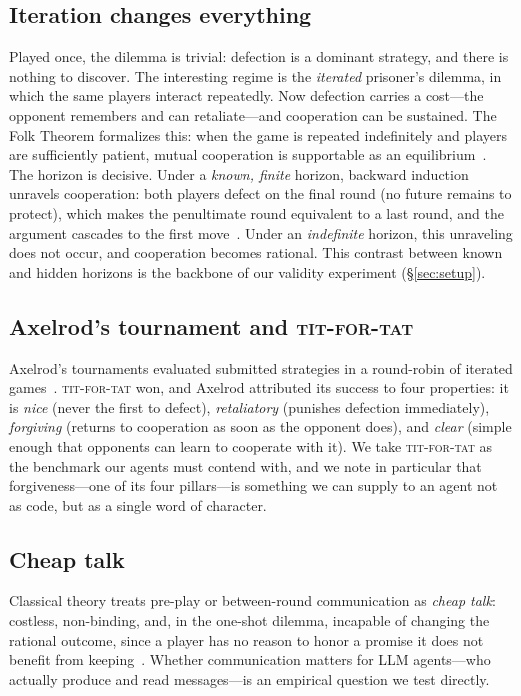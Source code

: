 \subsection{Iteration changes everything}
Played once, the dilemma is trivial: defection is a dominant strategy, and there is nothing to discover. The interesting regime is the \emph{iterated} prisoner's dilemma, in which the same players interact repeatedly. Now defection carries a cost---the opponent remembers and can retaliate---and cooperation can be sustained. The Folk Theorem formalizes this: when the game is repeated indefinitely and players are sufficiently patient, mutual cooperation is supportable as an equilibrium~\cite{fudenberg1986folk}. The horizon is decisive. Under a \emph{known, finite} horizon, backward induction unravels cooperation: both players defect on the final round (no future remains to protect), which makes the penultimate round equivalent to a last round, and the argument cascades to the first move~\cite{selten1978chain}. Under an \emph{indefinite} horizon, this unraveling does not occur, and cooperation becomes rational. This contrast between known and hidden horizons is the backbone of our validity experiment (\S\ref{sec:setup}).

\subsection{Axelrod's tournament and \textsc{tit-for-tat}}
Axelrod's tournaments evaluated submitted strategies in a round-robin of iterated games~\cite{axelrod1984evolution}. \textsc{tit-for-tat} won, and Axelrod attributed its success to four properties: it is \emph{nice} (never the first to defect), \emph{retaliatory} (punishes defection immediately), \emph{forgiving} (returns to cooperation as soon as the opponent does), and \emph{clear} (simple enough that opponents can learn to cooperate with it). We take \textsc{tit-for-tat} as the benchmark our agents must contend with, and we note in particular that forgiveness---one of its four pillars---is something we can supply to an agent not as code, but as a single word of character.

\subsection{Cheap talk}
Classical theory treats pre-play or between-round communication as \emph{cheap talk}: costless, non-binding, and, in the one-shot dilemma, incapable of changing the rational outcome, since a player has no reason to honor a promise it does not benefit from keeping~\cite{crawford1982strategic, farrell1996cheap}. Whether communication matters for LLM agents---who actually produce and read messages---is an empirical question we test directly.

